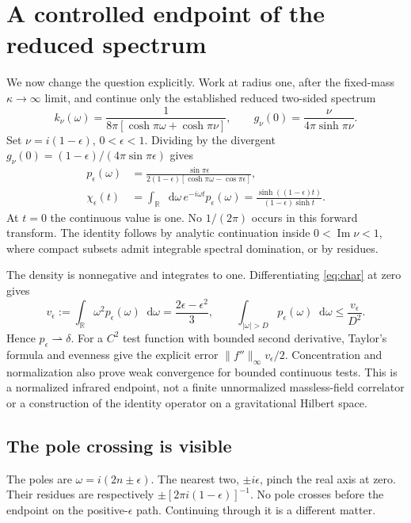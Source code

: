 \documentclass[11pt,a4paper]{article}
\newcommand{\dd}{\mathop{}\!\mathrm d}
\begin{document}
\section{A controlled endpoint of the reduced spectrum}
We now change the question explicitly. Work at radius one,
after the fixed-mass \(\kappa\to\infty\) limit, and continue only
the established reduced two-sided spectrum
\begin{equation}
 k_\nu(\omega)=\frac1{8\pi[\cosh\pi\omega+\cosh\pi\nu]},
 \qquad g_\nu(0)=\frac{\nu}{4\pi\sinh\pi\nu}.
\end{equation}
Set \(\nu=i(1-\epsilon)\), \(0<\epsilon<1\).
Dividing by the divergent
\(g_\nu(0)=(1-\epsilon)/(4\pi\sin\pi\epsilon)\) gives
\begin{align}
 p_\epsilon(\omega)&=
 \frac{\sin\pi\epsilon}
 {2(1-\epsilon)[\cosh\pi\omega-\cos\pi\epsilon]},\\
 \chi_\epsilon(t)&=\int_{\mathbb R}\dd\omega\,
 e^{-i\omega t}p_\epsilon(\omega)
 =\frac{\sinh((1-\epsilon)t)}{(1-\epsilon)\sinh t}.
 \label{eq:char}
\end{align}
At \(t=0\) the continuous value is one. No \(1/(2\pi)\) occurs
in this forward transform. The identity follows by analytic
continuation inside \(0<\operatorname{Im}\nu<1\), where compact
subsets admit integrable spectral domination, or by residues.

The density is nonnegative and integrates to one. Differentiating
\eqref{eq:char} at zero gives
\begin{equation}
 v_\epsilon:=\int_{\mathbb R}\omega^2p_\epsilon(\omega)\dd\omega
 =\frac{2\epsilon-\epsilon^2}{3},\qquad
 \int_{|\omega|>D}p_\epsilon(\omega)\dd\omega\le\frac{v_\epsilon}{D^2}.
 \label{eq:moment}
\end{equation}
Hence \(p_\epsilon\rightharpoonup\delta\).
For a \(C^2\) test function with bounded second derivative,
Taylor's formula and evenness give the explicit error
\(\|f''\|_\infty v_\epsilon/2\).
Concentration and normalization also prove weak convergence for
bounded continuous tests. This is a normalized infrared endpoint,
not a finite unnormalized massless-field correlator or a
construction of the identity operator on a gravitational Hilbert space.

\subsection*{The pole crossing is visible}
The poles are \(\omega=i(2n\pm\epsilon)\).
The nearest two, \(\pm i\epsilon\), pinch the real axis at zero.
Their residues are respectively
\(\pm[2\pi i(1-\epsilon)]^{-1}\).
No pole crosses before the endpoint on the positive-\(\epsilon\)
path. Continuing through it is a different matter.
\end{document}
